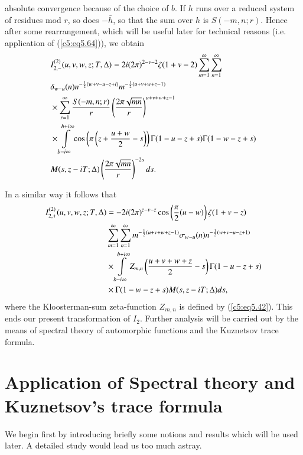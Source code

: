 absolute convergence because of the choice of $b$. If $h$ runs over a
reduced system of residues mod $r$, so does $-\bar{h}$, so that the
sum over $h$ is $S(-m, n ;r)$. Hence after some rearrangement, which
will be useful later for technical reasons (i.e. application of
(\ref{c5:eq5.64})), we obtain  
\begin{align}
&I^{(2)}_{2,-} (u,v,w,z;T,\Delta) = 
2i (2\pi)^{2-v-2} \zeta (1+v -2) \sum\limits^\infty_{m=1}
\sum\limits^\infty_{n=1}\label{c5:eq5.44}\\ 
&\delta_{w-u} (n) n^{-\frac{1}{2} (w+v - u - z + l)} m^{-\frac{1}{2}
  (u+v+w+z-1)}\notag\\
&\times \sum\limits^\infty_{r=1} \frac{S(-m,n;r)}{r}
\left(\frac{2\pi \sqrt{mn}}{r} \right)^{u+v+w+z-1} \notag\\ 
&\times \int\limits^{b+i\infty}_{b - i \infty}  \cos \left(\pi \left(z+
\frac{u+w}{2} -s \right) \right) \Gamma (1-u - z + s) \Gamma
(1-w-z+s)\notag \\ 
&M(s, z - iT; \Delta) \left(\frac{2\pi \sqrt{mn}}{r}\right)^{-2s} ds.\notag 
\end{align}\pageoriginale

In a similar way it follows that
\begin{align}
I^{(2)}_{2,+} (u,v,w,z;T,\Delta)&= 
-2i (2\pi)^{z-v-z} \cos \left(\frac{\pi}{2} (u-w) \right) \zeta(1+v-z)\notag\\
&\sum\limits^\infty_{m=1} \sum\limits^\infty_{n=1} m^{-\frac{1}{2}
  (u+v+w+z-1)} \sigma_{w-u} (n) n^{-\frac{1}{2} (w+v-u-z+1)}\notag\\ 
&\times\int\limits^{b+ i\infty}_{b-i\infty} Z_{m,n} \left(\frac{u+v+w+z}{2}
- s\right)\Gamma (1- u -z + s)\notag\\ 
&\times \Gamma (1-w - z + s)M (s, z - iT;\Delta)
ds,\label{c5:eq5.45}  
\end{align}
where the Kloosterman-sum zeta-function $Z_{m,n}$ is defined by
(\ref{c5:eq5.42}). This ends our present transformation of
$I_2$. Further analysis will be carried out by the means of spectral
theory of automorphic functions and the Kuznetsov trace formula. 

\section[Application of Spectral theory and Kuznetsov's...]{Application of Spectral theory and Kuznetsov's trace 
  formula}\label{c5:sec5.3} 

We begin first by introducing briefly some notions and results which
will be used later. A detailed study would lead us too much astray. 

